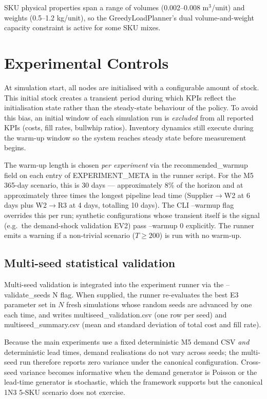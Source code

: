 SKU physical properties span a range of volumes (0.002--0.008 m$^3$/unit)
and weights (0.5--1.2 kg/unit), so the GreedyLoadPlanner's dual
volume-and-weight capacity constraint is active for some SKU mixes.

\section{Experimental Controls}
\label{sec:meth:warmup}

At simulation start, all nodes are initialised with a configurable
amount of stock.  This initial stock creates a transient period during
which KPIs reflect the initialisation state rather than the steady-state
behaviour of the policy.  To avoid this bias, an initial window of each
simulation run is \emph{excluded} from all reported KPIs (costs, fill
rates, bullwhip ratios).  Inventory dynamics still execute during the
warm-up window so the system reaches steady state before measurement
begins.

The warm-up length is chosen \emph{per experiment} via the
recommended\_warmup field on each entry of
EXPERIMENT\_META in the runner script.  For the M5 365-day
scenario, this is 30 days — approximately 8\% of the horizon and at
approximately three times the longest pipeline lead time (Supplier$\to$W2 at 6
days plus W2$\to$R3 at 4 days, totalling 10 days).  The CLI --warmup flag
overrides this per run; synthetic configurations whose transient
itself is the signal (e.g.\ the demand-shock validation EV2) pass
--warmup 0 explicitly.  The runner emits a warning if a
non-trivial scenario ($T \geq 200$) is run with no warm-up.

\subsection{Multi-seed statistical validation}
\label{sec:meth:multiseed}

Multi-seed validation is integrated into the experiment runner via the
--validate\_seeds N flag.  When supplied, the runner re-evaluates
the best E3 parameter set in $N$ fresh simulations whose random seeds
are advanced by one each time, and writes
multiseed\_validation.csv (one row per seed) and
multiseed\_summary.csv (mean and standard deviation of total
cost and fill rate).

Because the main experiments use a fixed deterministic M5 demand CSV
\emph{and} deterministic lead times, demand realisations do not vary
across seeds; the multi-seed run therefore reports zero variance under
the canonical configuration.  Cross-seed variance becomes informative
when the demand generator is Poisson or the lead-time generator is
stochastic, which the framework supports but the canonical 1N3 5-SKU
scenario does not exercise.


